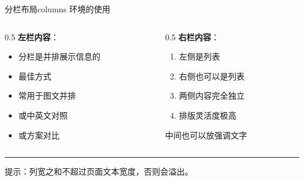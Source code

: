 \documentclass[UTF8,11pt,aspectratio=169]{beamer}
\begin{document}
\begin{frame}{分栏布局}{columns 环境的使用}

    \begin{columns}[T]  %
        \begin{column}{0.5\textwidth}
            \textbf{左栏内容}：
            \begin{itemize}
                \item 分栏是并排展示信息的
                \item 最佳方式
                \item 常用于图文并排
                \item 或中英文对照
                \item 或方案对比
            \end{itemize}
        \end{column}
        \begin{column}{0.5\textwidth}
            \textbf{右栏内容}：
            \begin{enumerate}
                \item 左侧是列表
                \item 右侧也可以是列表
                \item 两侧内容完全独立
                \item 排版灵活度极高
            \end{enumerate}
            \vspace{0.3cm}
            \centering
            \alert{中间也可以放强调文字}
        \end{column}
    \end{columns}

    \vspace{0.5cm}
    \hrule
    \vspace{0.3cm}
    \small 提示：列宽之和不超过页面文本宽度，否则会溢出。
\end{frame}
\end{document}
